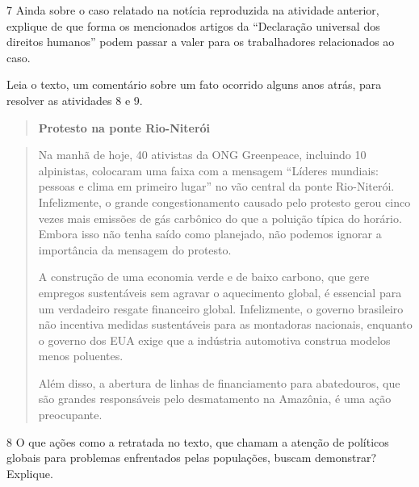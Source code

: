 \num{7} Ainda sobre o caso relatado na notícia reproduzida na atividade
anterior, explique de que forma os mencionados artigos da ``Declaração
universal dos direitos humanos'' podem passar a valer para os
trabalhadores relacionados ao caso.


Leia o texto, um comentário sobre um fato ocorrido alguns anos atrás,
para resolver as atividades 8 e 9.

\begin{quote}
\textbf{Protesto na ponte Rio-Niterói}
\end{quote}

\begin{quote}
Na manhã de hoje, 40 ativistas da ONG Greenpeace, incluindo 10
alpinistas, colocaram uma faixa com a mensagem ``Líderes mundiais:
pessoas e clima em primeiro lugar'' no vão central da ponte Rio-Niterói.
Infelizmente, o grande congestionamento causado pelo protesto gerou
cinco vezes mais emissões de gás carbônico do que a poluição típica do
horário. Embora isso não tenha saído como planejado, não podemos ignorar
a importância da mensagem do protesto.

A construção de uma economia verde e de baixo carbono, que gere empregos
sustentáveis sem agravar o aquecimento global, é essencial para um
verdadeiro resgate financeiro global. Infelizmente, o governo brasileiro
não incentiva medidas sustentáveis para as montadoras nacionais,
enquanto o governo dos EUA exige que a indústria automotiva construa
modelos menos poluentes.

Além disso, a abertura de linhas de financiamento para abatedouros, que
são grandes responsáveis pelo desmatamento na Amazônia, é uma ação
preocupante.
\end{quote}


\num{8} O que ações como a retratada no texto, que chamam a atenção de
políticos globais para problemas enfrentados pelas populações, buscam
demonstrar? Explique.


